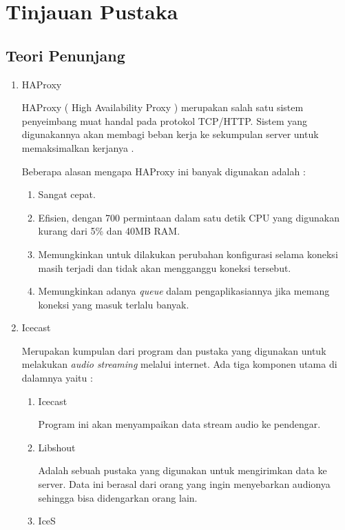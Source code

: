\chapter{Tinjauan Pustaka}
\section{Teori Penunjang}
\begin{enumerate}
    \item HAProxy
    
    HAProxy ( High Availability Proxy ) merupakan salah satu sistem penyeimbang muat handal pada protokol TCP/HTTP. Sistem yang digunakannya akan membagi beban kerja ke sekumpulan server untuk memaksimalkan kerjanya \cite{haproxy}.
    
    Beberapa alasan mengapa HAProxy ini banyak digunakan adalah : \cite{halebih}
    \begin{enumerate}
        \item Sangat cepat. 
        \item Efisien, dengan 700 permintaan dalam satu detik CPU yang digunakan kurang dari 5\% dan 40MB RAM.
        \item Memungkinkan untuk dilakukan perubahan konfigurasi selama koneksi masih terjadi dan tidak akan mengganggu koneksi tersebut.
        \item Memungkinkan adanya \textit{queue} dalam pengaplikasiannya jika memang koneksi yang masuk terlalu banyak.
    \end{enumerate}
    
    
    \item Icecast
    
    Merupakan kumpulan dari program dan pustaka yang digunakan untuk melakukan \textit{audio streaming} melalui internet. Ada tiga komponen utama di dalamnya yaitu \cite{ice}:
    
    \begin{enumerate}
        \item Icecast
        
        Program ini akan menyampaikan data stream audio ke pendengar.
        
        \item Libshout
        
        Adalah sebuah pustaka yang digunakan untuk mengirimkan data ke server. Data ini berasal dari orang yang ingin menyebarkan audionya sehingga bisa didengarkan orang lain.
        
        \item IceS
        

\end{enumerate}
\end{enumerate}
